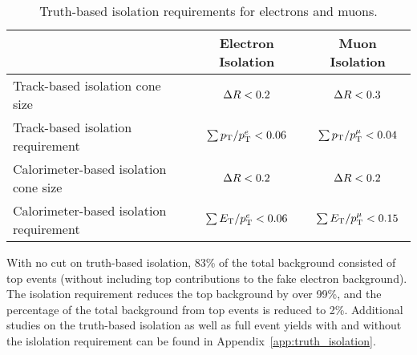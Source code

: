 \begin{table}[htp]
  \centering
  \begin{tabular}{l|c|c}
    ~       &   Electron Isolation & Muon Isolation \\
    \hline\hline
    Track-based isolation cone size   	    &   $\Delta R < 0.2$          & $\Delta R < 0.3$ \\
    Track-based isolation requirement       &   $\sum p_{\mathrm{T}}/p_{\mathrm{T}}^{e} <  0.06$ & $\sum p_{\mathrm{T}}/p_{\mathrm{T}}^{\mu} <  0.04$	\\
    Calorimeter-based isolation cone size   &   $\Delta R < 0.2$	         & $\Delta R < 0.2$\\
    Calorimeter-based isolation requirement &   $\sum E_{\mathrm{T}}/p_{\mathrm{T}}^{e} <  0.06$ & $\sum E_{\mathrm{T}}/p_{\mathrm{T}}^{\mu} <  0.15$	\\
    \hline
  \end{tabular}
  \caption{Truth-based isolation requirements for electrons and muons.} 
  \label{tab:truth_iso_definition}
\end{table}

With no cut on truth-based isolation, 83\% of the total background consisted of top events (without including top contributions to the fake electron background).
The isolation requirement reduces the top background by over 99\%, and the percentage of the total background from top events is reduced to 2\%.
Additional studies on the truth-based isolation as well as full event yields with and without the islolation requirement can be found in Appendix~\ref{app:truth_isolation}.
